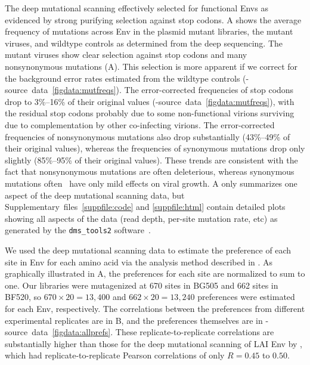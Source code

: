\documentclass[9pt]{elife}
\begin{document}
The deep mutational scanning effectively selected for functional Envs as evidenced by strong purifying selection against stop codons.
A shows the average frequency of mutations across Env in the plasmid mutant libraries, the mutant viruses, and wildtype controls as determined from the deep sequencing.
The mutant viruses show clear selection against stop codons and many nonsynonymous mutations (A).
This selection is more apparent if we correct for the background error rates estimated from the wildtype controls (-source~data~\ref{figdata:mutfreqs}).
The error-corrected frequencies of stop codons drop to 3\%--16\% of their original values (-source~data~\ref{figdata:mutfreqs}), with the residual stop codons probably due to some non-functional virions surviving due to complementation by other co-infecting virions. 
The error-corrected frequencies of nonsynonymous mutations also drop substantially (43\%--49\% of their original values), whereas the frequencies of synonymous mutations drop only slightly (85\%--95\% of their original values).
These trends are consistent with the fact that nonsynonymous mutations are often deleterious, whereas synonymous mutations often~\citep[although certainly not always, see][]{zanini2013quantifying} have only mild effects on viral growth.
A only summarizes one aspect of the deep mutational scanning data, but Supplementary~files~\ref{suppfile:code} and \ref{suppfile:html} contain detailed plots showing all aspects of the data (read depth, per-site mutation rate, etc) as generated by the \texttt{dms\_tools2} software~\citep[\url{https://jbloomlab.github.io/dms_tools2/}]{bloom2015software}.

We used the deep mutational scanning data to estimate the preference of each site in Env for each amino acid via the analysis method described in \citet{bloom2015software}.
As graphically illustrated in A, the preferences for each site are normalized to sum to one.
Our libraries were mutagenized at 670 sites in BG505 and 662 sites in BF520, so $670 \times 20 = 13,400$ and $662 \times 20 = 13,240$ preferences were estimated for each Env, respectively.
The correlations between the preferences from different experimental replicates are in B, and the preferences themselves are in -source~data~\ref{figdata:allprefs}.
These replicate-to-replicate correlations are substantially higher than those for the deep mutational scanning of LAI Env by \citet{haddox2016experimental}, which had replicate-to-replicate Pearson correlations of only $R = 0.45$ to $0.50$. 
\end{document}
